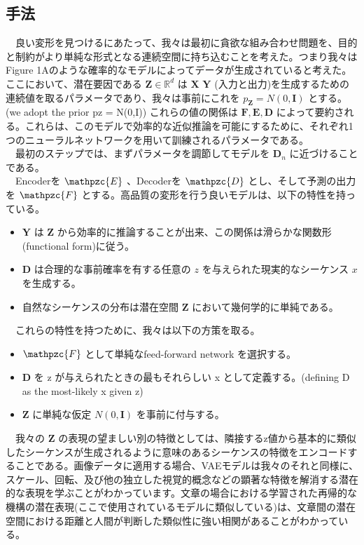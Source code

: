 \documentclass{scrartcl}
\begin{document}
\subsection{手法}
\label{sec:orgcbff4d9}
　良い変形を見つけるにあたって、我々は最初に貪欲な組み合わせ問題を、目的と制約がより単純な形式となる連続空間に持ち込むことを考えた。つまり我々はFigure 1Aのような確率的なモデルによってデータが生成されていると考えた。ここにおいて、潜在要因である \(\bm{Z}\in\mathbb{R}^d\) は \(\bm{X}\) \(\bm{Y}\) (入力と出力)を生成するための連続値を取るパラメータであり、我々は事前にこれを \(p_{\bm{Z}} = N(0, \bm{I})\) とする。(we adopt the prior pz = N(0,I)) これらの値の関係は \(\bm{F}, \bm{E}, \bm{D}\) によって要約される。これらは、このモデルで効率的な近似推論を可能にするために、それぞれ1つのニューラルネットワークを用いて訓練されるパラメータである。\\
　最初のステップでは、まずパラメータを調節してモデルを \(\bm{D}_n\) に近づけることである。\\
　Encoderを \(\mathpzc{E}\) 、Decoderを \(\mathpzc{D}\) とし、そして予測の出力を \(\mathpzc{F}\) とする。高品質の変形を行う良いモデルは、以下の特性を持っている。\\
\begin{itemize}
\item \(\bm{Y}\) は \(\bm{Z}\) から効率的に推論することが出来、この関係は滑らかな関数形(functional form)に従う。\\
\item \(\bm{D}\) は合理的な事前確率を有する任意の \(z\) を与えられた現実的なシーケンス \(x\) を生成する。\\
\item 自然なシーケンスの分布は潜在空間 \(\bm{Z}\) において幾何学的に単純である。\\
\end{itemize}
　これらの特性を持つために、我々は以下の方策を取る。\\
\begin{itemize}
\item \(\mathpzc{F}\) として単純なfeed-forward network を選択する。\\
\item \(\bm{D}\) を z が与えられたときの最もそれらしい x として定義する。(defining D as the most-likely x given z)\\
\item \(\bm{Z}\) に単純な仮定 \(N(0, \bm{I})\) を事前に付与する。\\
\end{itemize}
　我々の \(\bm{Z}\) の表現の望ましい別の特徴としては、隣接するz値から基本的に類似したシーケンスが生成されるように意味のあるシーケンスの特徴をエンコードすることである。画像データに適用する場合、VAEモデルは我々のそれと同様に、スケール、回転、及び他の独立した視覚的概念などの顕著な特徴を解消する潜在的な表現を学ぶことがわかっています。文章の場合における学習された再帰的な機構の潜在表現(ここで使用されているモデルに類似している)は、文章間の潜在空間における距離と人間が判断した類似性に強い相関があることがわかっている。\\
\end{document}
